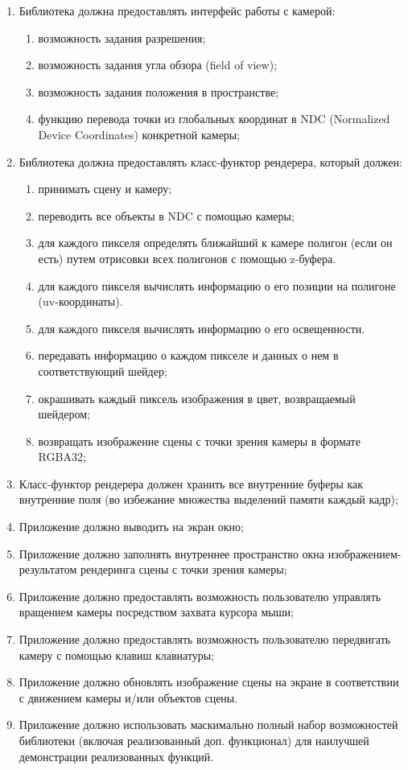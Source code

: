 \begin{enumerate}
    \item Библиотека должна предоставлять интерфейс работы с камерой:
    \begin{enumerate}
        \item возможность задания разрешения;
        \item возможность задания угла обзора (field of view);
        \item возможность задания положения в пространстве;
        \item функцию перевода точки из глобальных координат в NDC (Normalized Device Coordinates) конкретной камеры;
    \end{enumerate}
    \item Библиотека должна предоставлять класс-функтор рендерера, который должен:
    \begin{enumerate}
        \item принимать сцену и камеру;
        \item переводить все объекты в NDC с помощью камеры;
        \item для каждого пикселя определять ближайший к камере полигон (если он есть) путем отрисовки всех полигонов с помощью z-буфера.
        \item для каждого пикселя вычислять информацию о его позиции на полигоне (uv-координаты).
        \item для каждого пикселя вычислять информацию о его освещенности.
        \item передавать информацию о каждом пикселе и данных о нем в соответствующий шейдер;
        \item окрашивать каждый пиксель изображения в цвет, возвращаемый шейдером;
        \item возвращать изображение сцены с точки зрения камеры в формате RGBA32;
    \end{enumerate}
    \item Класс-функтор рендерера должен хранить все внутренние буферы как внутренние поля (во избежание множества выделений памяти каждый кадр);
    \item Приложение должно выводить на экран окно;
    \item Приложение должно заполнять внутреннее пространство окна изображением-результатом рендеринга сцены с точки зрения камеры;
    \item Приложение должно предоставлять возможность пользователю управлять вращением камеры посредством захвата курсора мыши;
    \item Приложение должно предоставлять возможность пользователю передвигать камеру с помощью клавиш клавиатуры;
    \item Приложение должно обновлять изображение сцены на экране в соответствии с движением камеры и/или объектов сцены.
    \item Приложение должно использовать маскимально полный набор возможностей библиотеки (включая реализованный доп. функционал) для наилучшей демонстрации реализованных функций.
\end{enumerate}

